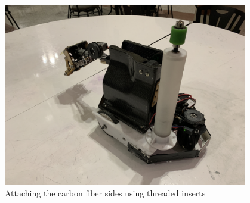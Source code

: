 \begin{figure}[htp]
\centering
\includegraphics[width=0.95\textwidth, angle=0]{Meetings/February/02-19-22/2-19-22_Hardware_Figure1 - Nathan Forrer.JPG}
\caption{Attaching the carbon fiber sides using threaded inserts}
\label{fig:021922_1}
\end{figure}



